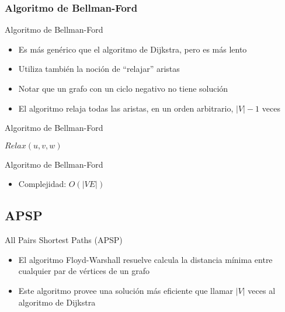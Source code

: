 \documentclass[handout]{beamer}
\begin{document}
\subsubsection{Algoritmo de Bellman-Ford}
\begin{frame}{Algoritmo de Bellman-Ford}
  \begin{itemize}
    \item Es m\'as gen\'erico que el algoritmo de Dijkstra, pero es m\'as lento
      \pause
    \item Utiliza tambi\'en la noci\'on de ``relajar'' aristas
      \pause
    \item Notar que un grafo con un ciclo negativo no tiene soluci\'on
      \pause
    \item El algoritmo relaja todas las aristas, en un orden arbitrario, $|V|-1$ veces
  \end{itemize}
\end{frame}

\begin{frame}{Algoritmo de Bellman-Ford}
  \begin{algorithm}[H]
    \BlankLine
    {
      {
        $ Relax(u, v, w) $

      }
    }
    {
      {
      }
    }
  \end{algorithm}
\end{frame}

\begin{frame}{Algoritmo de Bellman-Ford}
  \begin{itemize}
    \item Complejidad: $O(|VE|)$
  \end{itemize}
\end{frame}

\subsection{APSP}
\begin{frame}{All Pairs Shortest Paths (APSP)}
 \begin{itemize}
    \item El algoritmo Floyd-Warshall resuelve calcula la distancia m\'inima entre cualquier par de v\'ertices de un grafo
      \pause
    \item Este algoritmo provee una soluci\'on m\'as eficiente que llamar $|V|$ veces al algoritmo de Dijkstra
  \end{itemize}
\end{frame}
\end{document}
